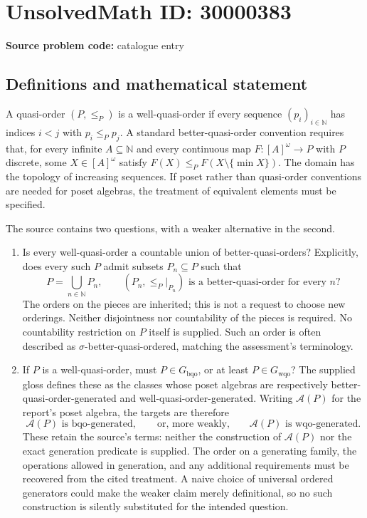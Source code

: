 \documentclass[11pt]{article}
\newcommand{\N}{\mathbb{N}}
\begin{document}
\section*{UnsolvedMath ID: 30000383}
\textbf{Source problem code:} catalogue entry
\subsection{Definitions and mathematical statement}
A quasi-order $(P,\le_P)$ is a well-quasi-order if every sequence $(p_i)_{i\in\N}$ has indices $i<j$ with $p_i\le_Pp_j$. A standard better-quasi-order convention requires that, for every infinite $A\subseteq\N$ and every continuous map $F:[A]^\omega\to P$ with $P$ discrete, some $X\in[A]^\omega$ satisfy $F(X)\le_PF(X\setminus\{\min X\})$. The domain has the topology of increasing sequences. If poset rather than quasi-order conventions are needed for poset algebras, the treatment of equivalent elements must be specified.

The source contains two questions, with a weaker alternative in the second.
\begin{enumerate}
\item Is every well-quasi-order a countable union of better-quasi-orders? Explicitly, does every such $P$ admit subsets $P_n\subseteq P$ such that
\[
 P=\bigcup_{n\in\N}P_n,\qquad
 (P_n,\le_P|_{P_n})\text{ is a better-quasi-order for every }n?
\]
The orders on the pieces are inherited; this is not a request to choose new orderings. Neither disjointness nor countability of the pieces is required. No countability restriction on $P$ itself is supplied. Such an order is often described as $\sigma$-better-quasi-ordered, matching the assessment's terminology.
\item If $P$ is a well-quasi-order, must $P\in G_{\mathrm{bqo}}$, or at least $P\in G_{\mathrm{wqo}}$? The supplied gloss defines these as the classes whose poset algebras are respectively better-quasi-order-generated and well-quasi-order-generated. Writing $\mathcal A(P)$ for the report's poset algebra, the targets are therefore
\[
 \mathcal A(P)\text{ is bqo-generated},
 \qquad\text{or, more weakly,}\qquad
 \mathcal A(P)\text{ is wqo-generated}.
\]
These retain the source's terms: neither the construction of $\mathcal A(P)$ nor the exact generation predicate is supplied. The order on a generating family, the operations allowed in generation, and any additional requirements must be recovered from the cited treatment. A naive choice of universal ordered generators could make the weaker claim merely definitional, so no such construction is silently substituted for the intended question.
\end{enumerate}
\end{document}
